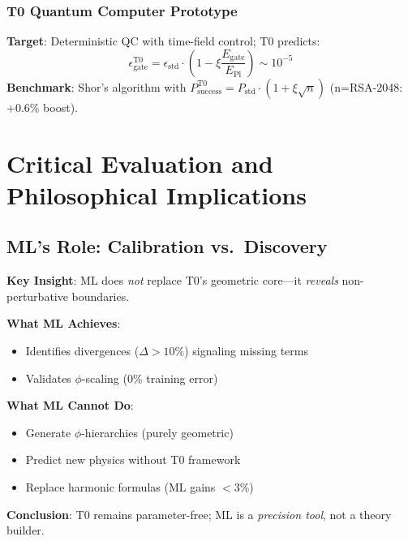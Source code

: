 	\subsubsection{T0 Quantum Computer Prototype}
	
	\textbf{Target}: Deterministic QC with time-field control; T0 predicts:
	\begin{equation}
		\epsilon_{\text{gate}}^{\text{T0}} = \epsilon_{\text{std}} \cdot \left(1 - \xi \frac{E_{\text{gate}}}{E_{\text{Pl}}}\right) \sim 10^{-5} \tag{T0-Orig Eq.~5.2.1}
	\end{equation}
	\textbf{Benchmark}: Shor's algorithm with $P_{\text{success}}^{\text{T0}} = P_{\text{std}} \cdot (1 + \xi\sqrt{n})$ (n=RSA-2048: +0.6\% boost).
	
	\section{Critical Evaluation and Philosophical Implications}
	
	\subsection{ML's Role: Calibration vs.~Discovery}
	
	\textbf{Key Insight}: ML does \textit{not} replace T0's geometric core---it \textit{reveals} non-perturbative boundaries.
	
	\begin{tcolorbox}[colback=red!5!white,colframe=red!75!black,title={ML Limitations in T0}]
		\textbf{What ML Achieves}:
		\begin{itemize}
			\item Identifies divergences ($\Delta>10\%$) signaling missing terms
			\item Validates $\phi$-scaling (0\% training error)
		\end{itemize}
		\textbf{What ML Cannot Do}:
		\begin{itemize}
			\item Generate $\phi$-hierarchies (purely geometric)
			\item Predict new physics without T0 framework
			\item Replace harmonic formulas (ML gains $<3\%$)
		\end{itemize}
	\end{tcolorbox}
	
	\textbf{Conclusion}: T0 remains parameter-free; ML is a \textit{precision tool}, not a theory builder.
	
